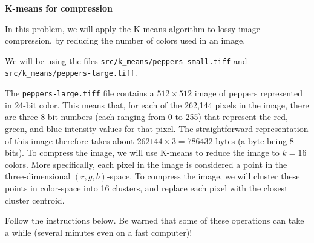 \item {} {\bf K-means for compression}

In this problem, we will apply the K-means algorithm to lossy image
compression, by reducing the number of colors used in an image.

We will be using the files \texttt{src/k\_means/peppers-small.tiff} and \texttt{src/k\_means/peppers-large.tiff}.
	

The \texttt{peppers-large.tiff} file contains
a $512 \times 512$ image of peppers represented in 24-bit color. This means
that, for each of the 262,144 pixels in the image, there are three
8-bit numbers (each ranging from 0 to 255) that represent the red,
green, and blue intensity values for that pixel. The straightforward
representation of this image therefore takes about $262144 \times 3 =
786432$ bytes (a byte being 8 bits). To compress the image, we will
use K-means to reduce the image to $k = 16$ colors. More specifically,
each pixel in the image is considered a point in the three-dimensional
$(r, g, b)$-space. To compress the image, we will cluster these points
in color-space into 16 clusters, and replace each pixel with the
closest cluster centroid.

Follow the instructions below. Be warned that some of these operations
can take a while (several minutes even on a fast computer)!


\begin{enumerate}

  
\ifnum{} {
  
} \fi


  

\ifnum{} {
  
} \fi

\end{enumerate}

